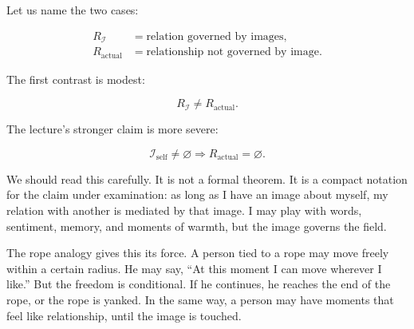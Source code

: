 Let us name the two cases:

\begin{align}
R_{\mathcal{I}} &= \text{relation governed by images}, \\
R_{\text{actual}} &= \text{relationship not governed by image}.
\end{align}

The first contrast is modest:

\begin{equation}
R_{\mathcal{I}} \neq R_{\text{actual}}.
\end{equation}

The lecture's stronger claim is more severe:

\begin{equation}
\mathcal{I}_{\text{self}} \neq \varnothing
\Rightarrow
R_{\text{actual}} = \varnothing.
\end{equation}

We should read this carefully. It is not a formal theorem. It is a compact notation for the claim under examination: as long as I have an image about myself, my relation with another is mediated by that image. I may play with words, sentiment, memory, and moments of warmth, but the image governs the field.

The rope analogy gives this its force. A person tied to a rope may move freely within a certain radius. He may say, ``At this moment I can move wherever I like.'' But the freedom is conditional. If he continues, he reaches the end of the rope, or the rope is yanked. In the same way, a person may have moments that feel like relationship, until the image is touched.

\begin{figure}
\centering
{}
\end{figure}

